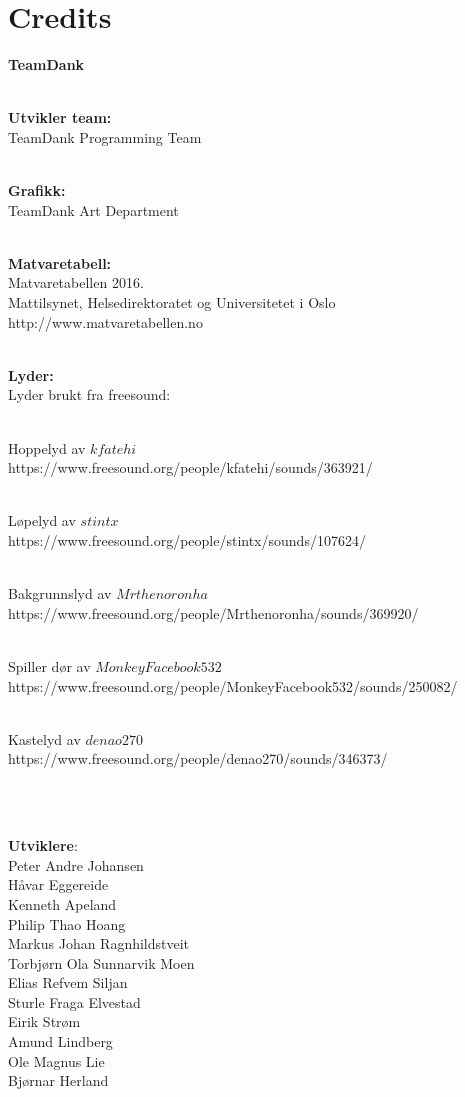 \documentclass[paper=a4]{article}
\begin{document}
\newpage
\section{Credits}

\begin{center} 
\textbf{TeamDank}\\ \

\textbf{Utvikler team:}\\
TeamDank Programming Team\\ \

\textbf{Grafikk:} \\
TeamDank Art Department \\ \

\textbf{Matvaretabell:} \\ 
Matvaretabellen 2016. \\
Mattilsynet, Helsedirektoratet og Universitetet i Oslo \\ http://www.matvaretabellen.no \\ \

\textbf{Lyder:} \\ 
Lyder brukt fra freesound: \\ \

Hoppelyd av $kfatehi$ \\ https://www.freesound.org/people/kfatehi/sounds/363921/ \\ \

Løpelyd av $stintx$ \\ https://www.freesound.org/people/stintx/sounds/107624/ \\ \

Bakgrunnslyd av $Mrthenoronha$ \\ https://www.freesound.org/people/Mrthenoronha/sounds/369920/ \\ \

Spiller dør av $MonkeyFacebook532$ \\ https://www.freesound.org/people/MonkeyFacebook532/sounds/250082/ \\ \

Kastelyd av $denao270$ \\ https://www.freesound.org/people/denao270/sounds/346373/ \\ \

\

\textbf{Utviklere}: \\
Peter Andre Johansen \\
Håvar Eggereide \\
Kenneth Apeland \\
Philip Thao Hoang \\
Markus Johan Ragnhildstveit \\
Torbjørn Ola Sunnarvik Moen \\
Elias Refvem Siljan \\
Sturle Fraga Elvestad \\
Eirik Strøm \\
Amund Lindberg \\
Ole Magnus Lie \\
Bjørnar Herland \\ \


\end{center}
\end{document}
